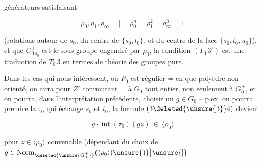
générateurs satisfaisant

\[
\rho_0,\rho_1,\rho_\infty\quad\mid\quad \rho_0^n=\rho_1^2=\rho_\infty^3=1
\]


(rotations autour de $s_0$, du centre de $\{s_0,t_0\}$, et du centre de la face $\{s_0,t_0,u_0\}$), et que $G_{0\,s_0}^+$ est le sous-groupe engendré par $\rho_0$, la condition $(T_0\,3')$ est  une traduction de $T_0\,3$ en termes de théorie des groupes pure. 

Dans les cas qui nous intéressent, où $P_0$ est régulier = en  que polyèdre non orienté, on aura pour  $Z'$ commutant = à $G_0$ tout entier, non seulement à $G_0^+$, et on pourra, dans l'interprétation précédente, choisir un $g\in G_0$ -- p.ex. on pourra prendre la  $\tau_0$  qui échange $s_0$ et $t_0$, la formule $(3\deleted{\unsure{3}}4)$ devient

\[
g\cdot\operatorname{int}(\tau_0)(gz)\ \in\ \langle\rho_0\rangle \tag*{$(34')$}
\]


pour $z\in\langle\rho_0\rangle$ convenable (dépendant du choix de $g\in\operatorname{Norm}_{\deleted{\unsure{G_0^+}}}(\langle\rho_0\rangle)\unsure{)}\bigr]\unsure{]}$
